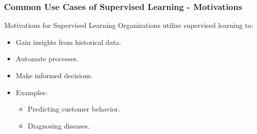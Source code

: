 \documentclass[aspectratio=169]{beamer}
\begin{document}
\begin{frame}[fragile]
    \frametitle{Common Use Cases of Supervised Learning - Motivations}
    \begin{block}{Motivations for Supervised Learning}
        Organizations utilize supervised learning to:
        \begin{itemize}
            \item Gain insights from historical data.
            \item Automate processes.
            \item Make informed decisions.
        \end{itemize}
    \end{block}
    \begin{itemize}
        \item Examples: 
            \begin{itemize}
                \item Predicting customer behavior.
                \item Diagnosing diseases.
            \end{itemize}
    \end{itemize}
\end{frame}
\end{document}
